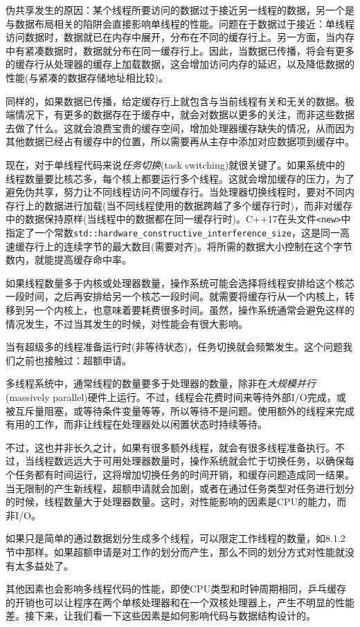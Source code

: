 伪共享发生的原因：某个线程所要访问的数据过于接近另一线程的数据，另一个是与数据布局相关的陷阱会直接影响单线程的性能。问题在于数据过于接近：单线程访问数据时，数据就已在内存中展开，分布在不同的缓存行上。另一方面，当内存中有紧凑数据时，数据就分布在同一缓存行上。因此，当数据已传播，将会有更多的缓存行从处理器的缓存上加载数据，这会增加访问内存的延迟，以及降低数据的性能(与紧凑的数据存储地址相比较)。

同样的，如果数据已传播，给定缓存行上就包含与当前线程有关和无关的数据。极端情况下，有更多的数据存在于缓存中，就会对数据以更多的关注，而非这些数据去做了什么。这就会浪费宝贵的缓存空间，增加处理器缓存缺失的情况，从而因为其他数据已经占有缓存中的位置，所以需要再从主存中添加对应数据项到缓存中。

现在，对于单线程代码来说\textit{任务切换}(task switching)就很关键了。如果系统中的线程数量要比核芯多，每个核上都要运行多个线程。这就会增加缓存的压力，为了避免伪共享，努力让不同线程访问不同缓存行。当处理器切换线程时，要对不同内存行上的数据进行加载(当不同线程使用的数据跨越了多个缓存行时)，而非对缓存中的数据保持原样(当线程中的数据都在同一缓存行时)。C++17在头文件\texttt{<new>}中指定了一个常数\texttt{std::hardware\_constructive\_interference\_size}，这是同一高速缓存行上的连续字节的最大数目(需要对齐)。将所需的数据大小控制在这个字节数内，就能提高缓存命中率。

如果线程数量多于内核或处理器数量，操作系统可能会选择将线程安排给这个核芯一段时间，之后再安排给另一个核芯一段时间。就需要将缓存行从一个内核上，转移到另一个内核上，也意味着要耗费很多时间。虽然，操作系统通常会避免这样的情况发生，不过当其发生的时候，对性能会有很大影响。

当有超级多的线程准备运行时(非等待状态)，任务切换就会频繁发生。这个问题我们之前也接触过：超额申请。


多线程系统中，通常线程的数量要多于处理器的数量，除非在\textit{大规模并行}(massively parallel)硬件上运行。不过，线程会花费时间来等待外部I/O完成，或被互斥量阻塞，或等待条件变量等等，所以等待不是问题。使用额外的线程来完成有用的工作，而非让线程在处理器处以闲置状态时持续等待。

不过，这也并非长久之计，如果有很多额外线程，就会有很多线程准备执行。不过，当线程数远远大于可用处理器数量时，操作系统就会忙于切换任务，以确保每个任务都有时间运行，这将增加切换任务的时间开销，和缓存问题造成同一结果。当无限制的产生新线程，超额申请就会加剧，或者在通过任务类型对任务进行划分的时候，线程数量大于处理器数量。这时，对性能影响的因素是CPU的能力，而非I/O。

如果只是简单的通过数据划分生成多个线程，可以限定工作线程的数量，如8.1.2节中那样。如果超额申请是对工作的划分而产生，那么不同的划分方式对性能就没有太多益处了。

其他因素也会影响多线程代码的性能，即使CPU类型和时钟周期相同，乒乓缓存的开销也可以让程序在两个单核处理器和在一个双核处理器上，产生不明显的性能差。接下来，让我们看一下这些因素是如何影响代码与数据结构设计的。